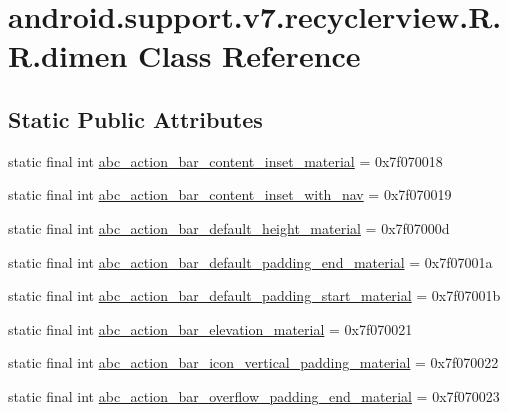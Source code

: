 \hypertarget{classandroid_1_1support_1_1v7_1_1recyclerview_1_1_r_1_1dimen}{
\section{android.support.v7.recyclerview.R.R.dimen Class Reference}
\label{classandroid_1_1support_1_1v7_1_1recyclerview_1_1_r_1_1dimen}
}
\subsection*{Static Public Attributes}
\begin{CompactItemize}
\item 
static final int \hyperlink{classandroid_1_1support_1_1v7_1_1recyclerview_1_1_r_1_1dimen_50daddf34f88dd47cfea17f88d92af8c}{abc\_\-action\_\-bar\_\-content\_\-inset\_\-material} = 0x7f070018
\item 
static final int \hyperlink{classandroid_1_1support_1_1v7_1_1recyclerview_1_1_r_1_1dimen_5fedbd210c5a3fcbb02a16e15a7a0709}{abc\_\-action\_\-bar\_\-content\_\-inset\_\-with\_\-nav} = 0x7f070019
\item 
static final int \hyperlink{classandroid_1_1support_1_1v7_1_1recyclerview_1_1_r_1_1dimen_2e209f0a9e6129aa0f1166eadd5f69f0}{abc\_\-action\_\-bar\_\-default\_\-height\_\-material} = 0x7f07000d
\item 
static final int \hyperlink{classandroid_1_1support_1_1v7_1_1recyclerview_1_1_r_1_1dimen_5431610d69fdcad7fe91017510c22888}{abc\_\-action\_\-bar\_\-default\_\-padding\_\-end\_\-material} = 0x7f07001a
\item 
static final int \hyperlink{classandroid_1_1support_1_1v7_1_1recyclerview_1_1_r_1_1dimen_c58099d15ff05cb8e411af8ee7b18810}{abc\_\-action\_\-bar\_\-default\_\-padding\_\-start\_\-material} = 0x7f07001b
\item 
static final int \hyperlink{classandroid_1_1support_1_1v7_1_1recyclerview_1_1_r_1_1dimen_ff6807162c66550fd0f2074afcb603b6}{abc\_\-action\_\-bar\_\-elevation\_\-material} = 0x7f070021
\item 
static final int \hyperlink{classandroid_1_1support_1_1v7_1_1recyclerview_1_1_r_1_1dimen_ec7e13e8e08769038d68e05e02060b3f}{abc\_\-action\_\-bar\_\-icon\_\-vertical\_\-padding\_\-material} = 0x7f070022
\item 
static final int \hyperlink{classandroid_1_1support_1_1v7_1_1recyclerview_1_1_r_1_1dimen_30842f9027060c5db95b6f5e12215b56}{abc\_\-action\_\-bar\_\-overflow\_\-padding\_\-end\_\-material} = 0x7f070023

\end{CompactItemize}
